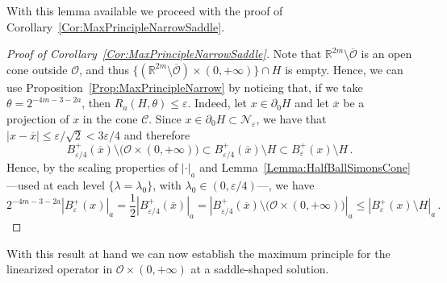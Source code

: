\documentclass[12pt,reqno]{amsart}
\theoremstyle{definition}
\theoremstyle{remark}
\newcommand{\con}[1]{\mathbb{#1}}
\newcommand{\R}{\con{R}} %
\newcommand{\ccal}{\mathscr{C}}
\newcommand{\ncal}{\mathcal{N}}
\newcommand{\ocal}{\mathcal{O}}
\numberwithin{equation}{section}
\begin{document}
With this lemma available we proceed with the proof of Corollary~\ref{Cor:MaxPrincipleNarrowSaddle}.

\begin{proof}[Proof of Corollary~\ref{Cor:MaxPrincipleNarrowSaddle}]
Note that $\R^{2m} \setminus \overline{\ocal}$ is an open cone outside $\ocal$, and thus $\{ (\R^{2m} \setminus \overline{\ocal}) \times (0, +\infty) \} \cap H $ is empty. Hence, we can use Proposition~\ref{Prop:MaxPrincipleNarrow} by noticing that,  if we take $\theta = 2^{-4m - 3-2a}$, then $R_a(H,\theta)\leq \varepsilon$. Indeed, let $x\in \partial_0 H$ and let $\overline{x}$ be a projection of $x$ in the cone $\ccal$. Since $x\in \partial_0 H \subset \ncal_\varepsilon$, we have that $|x-\overline{x}| \leq \varepsilon /\sqrt{2} < 3\varepsilon /4$ and therefore
$$
B_{\varepsilon/4}^+ (\overline{x})\setminus \big( \ocal \times (0, +\infty)\big) \subset B_{\varepsilon/4}^+ (\overline{x})\setminus H \subset B_\varepsilon^+ (x)\setminus H\,.
$$
Hence, by the scaling properties of $|\cdot|_a$ and Lemma~\ref{Lemma:HalfBallSimonsCone} ---used at each level $\{\lambda = \lambda_0\}$, with $\lambda_0\in (0,\varepsilon/4)$---, we have
$$
2^{-4m - 3-2a} |B^+_\varepsilon (x)|_a = \dfrac{1}{2} |B_{\varepsilon/4}^+(\overline{x}) |_a = |B_{\varepsilon/4}^+ (\overline{x})\setminus \big( \ocal \times (0, +\infty)\big)  |_a \leq |B_\varepsilon^+ (x)\setminus H |_a\,.
$$
\end{proof}


With this result at hand we can now establish the maximum principle for the linearized operator in $\ocal\times (0,+\infty)$ at a saddle-shaped solution.
\end{document}
